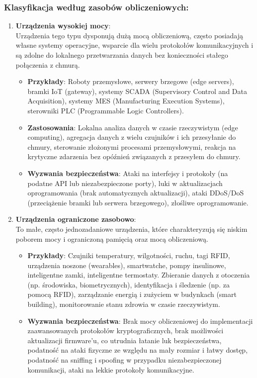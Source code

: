 \subsubsection{Klasyfikacja według zasobów obliczeniowych:}
    \begin{enumerate}
        \item \textbf{Urządzenia wysokiej mocy}: \\
        Urządzenia tego typu dysponują dużą mocą obliczeniową, często posiadają własne systemy operacyjne, wsparcie dla wielu protokołów komunikacyjnych i są zdolne do lokalnego przetwarzania danych bez konieczności stałego połączenia z chmurą.
        \begin{itemize}
            \item \textbf{Przykłady}: Roboty przemysłowe, serwery brzegowe (edge servers), bramki IoT (gateway), systemy SCADA (Supervisory Control and Data Acquisition), systemy MES (Manufacturing Execution Systems), sterowniki PLC (Programmable Logic Controllers). 
            \item \textbf{Zastosowania}: Lokalna analiza danych w czasie rzeczywistym (edge computing), agregacja danych z wielu czujników i ich przesyłanie do chmury, sterowanie złożonymi procesami przemysłowymi, reakcja na krytyczne zdarzenia bez opóźnień związanych z przesyłem do chmury.
            \item \textbf{Wyzwania bezpieczeństwa}: Ataki na interfejsy i protokoły (na podatne API lub niezabezpieczone porty), luki w aktualizacjach oprogramowania (brak automatycznych aktualizacji), ataki DDoS/DoS (przeciążenie bramki lub serwera brzegowego), złośliwe oprogramowanie.
        \end{itemize}
        \item \textbf{Urządzenia ograniczone zasobowo}: \\
        To małe, często jednozadaniowe urządzenia, które charakteryzują się niskim poborem mocy i ograniczoną pamięcią oraz mocą obliczeniową.
        \begin{itemize}
            \item \textbf{Przykłady}: Czujniki temperatury, wilgotności, ruchu, tagi RFID, urządzenia noszone (wearables), smartwatche, pompy insulinowe, inteligentne zamki, inteligentne termostaty. Zbieranie danych z otoczenia (np. środowiska, biometrycznych), identyfikacja i śledzenie (np. za pomocą RFID), zarządzanie energią i zużyciem w budynkach (smart building), monitorowanie stanu zdrowia w czasie rzeczywistym.
            \item \textbf{Wyzwania bezpieczeństwa}: Brak mocy obliczeniowej do implementacji zaawansowanych protokołów kryptograficznych, brak możliwości aktualizacji firmware'u, co utrudnia łatanie luk bezpieczeństwa, podatność na ataki fizyczne ze względu na mały rozmiar i łatwy dostęp, podatność na sniffing i spoofing w przypadku niezabezpieczonej komunikacji, ataki na lekkie protokoły komunikacyjne.
        \end{itemize}
    \end{enumerate}
    
